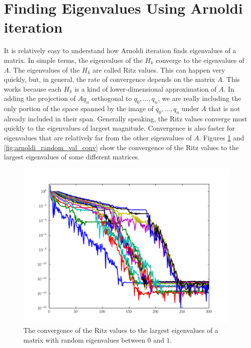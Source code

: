 
\section*{Finding Eigenvalues Using Arnoldi iteration}

It is relatively easy to understand how Arnoldi iteration finds eigenvalues of a matrix.
In simple terms, the eigenvalues of the $H_k$ converge to the eigenvalues of $A$.
The eigenvalues of the $H_k$ are called Ritz values.
This can happen very quickly, but, in general, the rate of convergence depends on the matrix $A$.
This works because each $H_k$ is a kind of lower-dimensional approximation of $A$.
In adding the projection of $A q_n$ orthogonal to $q_0, \ldots, q_n$, we are really including the only portion 
of the space spanned by the image of $q_0, \dots, q_n$ under $A$ that is not already included in their span.
Generally speaking, the Ritz values converge most quickly to the eigenvalues of largest magnitude.
Convergence is also faster for eigenvalues that are relatively far from the other eigenvalues of $A$.
Figures \ref{fig:arnoldi_random_eig_conv} and \ref{fig:arnoldi_random_val_conv} show the convergence of the 
Ritz values to the largest eigenvalues of some different matrices.

\begin{figure}
\includegraphics[width=\textwidth]{rand_eigs_conv.pdf}
\caption{The convergence of the Ritz values to the largest eigenvalues of a matrix with random eigenvalues between $0$ and $1$.}
\label{fig:arnoldi_random_eig_conv}
\end{figure}

